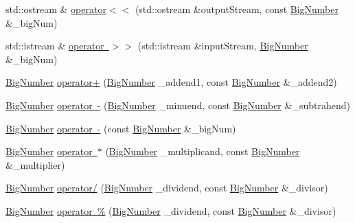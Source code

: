 \begin{DoxyCompactItemize}
\item 
std\+::ostream \& \mbox{\hyperlink{namespace_big_nums_aa974f80c6eaffabdcb244efbfc8ef40f}{operator$<$$<$}} (std\+::ostream \&output\+Stream, const \mbox{\hyperlink{class_big_nums_1_1_big_number}{Big\+Number}} \&\+\_\+big\+Num)
\item 
std\+::istream \& \mbox{\hyperlink{namespace_big_nums_a842a1460ed950581d97b842d8fb42910}{operator $>$$>$}} (std\+::istream \&input\+Stream, \mbox{\hyperlink{class_big_nums_1_1_big_number}{Big\+Number}} \&\+\_\+big\+Num)
\item 
\mbox{\hyperlink{class_big_nums_1_1_big_number}{Big\+Number}} \mbox{\hyperlink{namespace_big_nums_a43db6cb13170c6129a77c057ef76017e}{operator+}} (\mbox{\hyperlink{class_big_nums_1_1_big_number}{Big\+Number}} \+\_\+addend1, const \mbox{\hyperlink{class_big_nums_1_1_big_number}{Big\+Number}} \&\+\_\+addend2)
\item 
\mbox{\hyperlink{class_big_nums_1_1_big_number}{Big\+Number}} \mbox{\hyperlink{namespace_big_nums_a45951a2fb9f239876c94c8917b4d7ad1}{operator -\/}} (\mbox{\hyperlink{class_big_nums_1_1_big_number}{Big\+Number}} \+\_\+minuend, const \mbox{\hyperlink{class_big_nums_1_1_big_number}{Big\+Number}} \&\+\_\+subtrahend)
\item 
\mbox{\hyperlink{class_big_nums_1_1_big_number}{Big\+Number}} \mbox{\hyperlink{namespace_big_nums_afc1c2c149134a0b2a64347c14d96946d}{operator -\/}} (const \mbox{\hyperlink{class_big_nums_1_1_big_number}{Big\+Number}} \&\+\_\+big\+Num)
\item 
\mbox{\hyperlink{class_big_nums_1_1_big_number}{Big\+Number}} \mbox{\hyperlink{namespace_big_nums_a04ca82b2b679febecf3ac11a4fd58db1}{operator $\ast$}} (\mbox{\hyperlink{class_big_nums_1_1_big_number}{Big\+Number}} \+\_\+multiplicand, const \mbox{\hyperlink{class_big_nums_1_1_big_number}{Big\+Number}} \&\+\_\+multiplier)
\item 
\mbox{\hyperlink{class_big_nums_1_1_big_number}{Big\+Number}} \mbox{\hyperlink{namespace_big_nums_a5f3c743438ecf988d979eceb658f9cf9}{operator/}} (\mbox{\hyperlink{class_big_nums_1_1_big_number}{Big\+Number}} \+\_\+dividend, const \mbox{\hyperlink{class_big_nums_1_1_big_number}{Big\+Number}} \&\+\_\+divisor)
\item 
\mbox{\hyperlink{class_big_nums_1_1_big_number}{Big\+Number}} \mbox{\hyperlink{namespace_big_nums_ae7b3fba15d931353b415566997ad2bd2}{operator \%}} (\mbox{\hyperlink{class_big_nums_1_1_big_number}{Big\+Number}} \+\_\+dividend, const \mbox{\hyperlink{class_big_nums_1_1_big_number}{Big\+Number}} \&\+\_\+divisor)

\end{DoxyCompactItemize}
